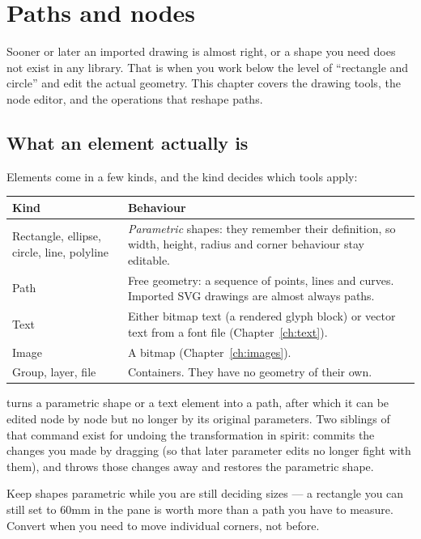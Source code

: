 \chapter{Paths and nodes}
\label{ch:paths}

Sooner or later an imported drawing is almost right, or a shape you need does not
exist in any library. That is when you work below the level of ``rectangle and
circle'' and edit the actual geometry. This chapter covers the drawing tools,
the node editor, and the operations that reshape paths.

\section{What an element actually is}

Elements come in a few kinds, and the kind decides which tools apply:

\begin{center}\small
\begin{tabular}{@{}L{3.0cm}L{11.2cm}@{}}
\toprule
\textbf{Kind} & \textbf{Behaviour} \\
\midrule
Rectangle, ellipse, circle, line, polyline & \emph{Parametric} shapes: they
remember their definition, so width, height, radius and corner behaviour stay
editable. \\
Path & Free geometry: a sequence of points, lines and curves. Imported SVG
drawings are almost always paths. \\
Text & Either bitmap text (a rendered glyph block) or vector text from a font
file (Chapter~\ref{ch:text}). \\
Image & A bitmap (Chapter~\ref{ch:images}). \\
Group, layer, file & Containers. They have no geometry of their own. \\
\bottomrule
\end{tabular}
\end{center}

\noindent {} turns a parametric shape or a text element into a
path, after which it can be edited node by node but no longer by its original
parameters. Two siblings of that command exist for undoing the transformation in
spirit:  commits the changes you made by dragging (so
that later parameter edits no longer fight with them), and
 throws those changes away and restores the parametric
shape.

\begin{tipbox}
Keep shapes parametric while you are still deciding sizes --- a rectangle you
can still set to 60\unit{mm} in the  pane is worth more than a
path you have to measure. Convert when you need to move individual corners, not
before.
\end{tipbox}

